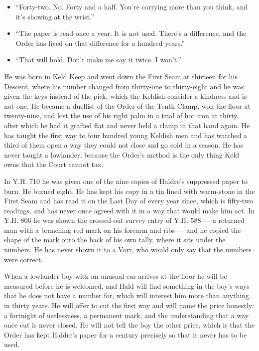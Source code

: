 \documentclass{design/chronicle}
\begin{document}
{\begin{itemize}[leftmargin=1.4em,itemsep=1pt,topsep=3pt,parsep=0pt]
\item “Forty-two. No. Forty and a half. You’re carrying more than you think, and it’s showing at the wrist.”

\item “The paper is read once a year. It is not used. There’s a difference, and the Order has lived on that difference for a hundred years.”

\item “That will hold. Don’t make me say it twice. I won’t.”

\end{itemize}

He was born in Keld Keep and went down the First Seam at thirteen for his Descent, where his number changed from thirty-one to thirty-eight and he was given the keys instead of the pick, which the Keldish consider a kindness and is not one. He became a duellist of the Order of the Tenth Clamp, won the floor at twenty-nine, and lost the use of his right palm in a trial of hot iron at thirty, after which he had it grafted flat and never held a clamp in that hand again. He has taught the first way to four hundred young Keldish men and has watched a third of them open a way they could not close and go cold in a season. He has never taught a lowlander, because the Order’s method is the only thing Keld owns that the Court cannot tax.

In Y.H. 710 he was given one of the nine copies of Haldre’s suppressed paper to burn. He burned eight. He has kept his copy in a tin lined with warm-stone in the First Seam and has read it on the Last Day of every year since, which is fifty-two readings, and has never once agreed with it in a way that would make him act. In Y.H. 806 he was shown the crossed-out survey entry of Y.H. 588 — a returned man with a branching red mark on his forearm and ribs — and he copied the shape of the mark onto the back of his own tally, where it sits under the numbers. He has never shown it to a Vorr, who would only say that the numbers were correct.

When a lowlander boy with an unusual ear arrives at the floor he will be measured before he is welcomed, and Hald will find something in the boy’s ways that he does not have a number for, which will interest him more than anything in thirty years. He will offer to cut the first way and will name the price honestly: a fortnight of uselessness, a permanent mark, and the understanding that a way once cut is never closed. He will not tell the boy the other price, which is that the Order has kept Haldre’s paper for a century precisely so that it never has to be used.

}
\end{document}
